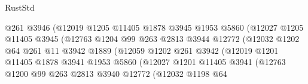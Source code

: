 \begin{lexlean}{RustStd}
\begin{coremodule}
                                    @261
                                    @3946
                                    (@12019
                                      @1205
                                      @11405
                                      @1878
                                      @3945
                                      @1953
                                      @5860
                                      (@12027
                                        @1205
                                        @11405
                                        @3945
                                        (@12763
                                          @1204
                                          @99
                                          @263
                                          @2813
                                          @3944
                                          @12772
                                          (@12032
                                            @1202
                                            @64
                                            @261
                                            @11
                                            @3942
                                            @1889
                                            (@12059
                                              @1202
                                              @261
                                              @3942
                                              (@12019
                                                @1201
                                                @11405
                                                @1878
                                                @3941
                                                @1953
                                                @5860
                                                (@12027
                                                  @1201
                                                  @11405
                                                  @3941
                                                  (@12763
                                                    @1200
                                                    @99
                                                    @263
                                                    @2813
                                                    @3940
                                                    @12772
                                                    (@12032
                                                      @1198
                                                      @64

\end{coremodule}
\end{lexlean}
